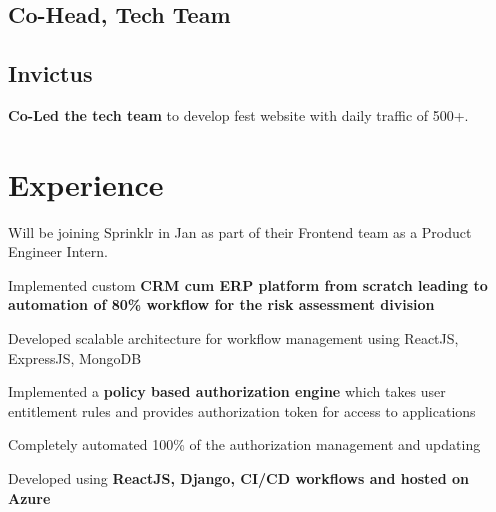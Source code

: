 \documentclass[]{ishaan-kamra-resume}
\begin{document}
\begin{minipage}[t]{0.33\textwidth}
    \subsection{Co-Head, Tech Team}
    \subsection{Invictus}
    \textbullet{} \textbf{Co-Led the tech team} to develop fest website with daily traffic of 500+.
    \sectionsep


\end{minipage}
\hfill
\begin{minipage}[t]{0.66\textwidth}


    \section{Experience}
    \vspace{\topsep} %
    \begin{tightemize}
        \item Will be joining Sprinklr in Jan as part of their Frontend team as a Product Engineer Intern.
    \end{tightemize}
    \sectionsep

    \begin{tightemize}
        \item Implemented custom \textbf{CRM cum ERP platform from scratch leading to automation of 80\% workflow for the risk assessment division}
        \item Developed scalable architecture for workflow management using ReactJS, ExpressJS, MongoDB
    \end{tightemize}
    \sectionsep

    \begin{tightemize}
        \item Implemented a \textbf{policy based authorization engine} which takes user entitlement rules and provides authorization token for access to applications
        \item Completely automated 100\% of the authorization management and updating
        \item Developed using \textbf{ReactJS, Django, CI/CD workflows and hosted on Azure}
    \end{tightemize}
    \sectionsep


\end{minipage}
\end{document}
